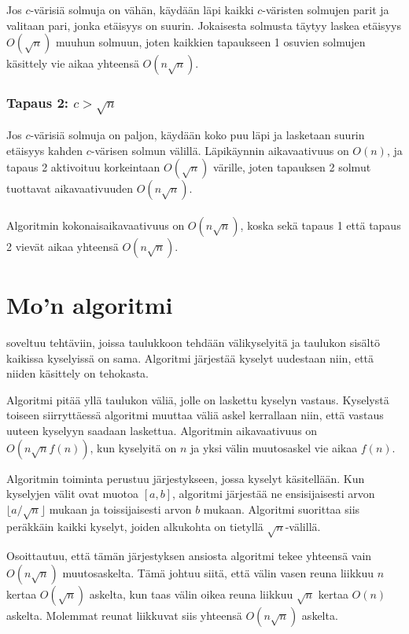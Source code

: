 Jos $c$-värisiä solmuja on vähän,
käydään läpi kaikki $c$-väristen solmujen parit
ja valitaan pari, jonka etäisyys on suurin.
Jokaisesta solmusta täytyy
laskea etäisyys $O(\sqrt n)$ muuhun solmuun,
joten kaikkien tapaukseen 1 osuvien solmujen
käsittely vie aikaa yhteensä $O(n \sqrt n)$.

\subsubsection*{Tapaus 2: $c > \sqrt n$}

Jos $c$-värisiä solmuja on paljon,
käydään koko puu läpi ja
lasketaan suurin etäisyys kahden
$c$-värisen solmun välillä.
Läpikäynnin aikavaativuus on $O(n)$,
ja tapaus 2 aktivoituu korkeintaan $O(\sqrt n)$
värille, joten tapauksen 2 solmut 
tuottavat aikavaativuuden $O(n \sqrt n)$.\\\\
\noindent
Algoritmin kokonaisaikavaativuus on $O(n \sqrt n)$,
koska sekä tapaus 1 että tapaus 2 vievät aikaa
yhteensä $O(n \sqrt n)$.

\section{Mo'n algoritmi}


 soveltuu tehtäviin,
joissa taulukkoon tehdään välikyselyitä ja
taulukon sisältö kaikissa kyselyissä on sama.
Algoritmi järjestää
kyselyt uudestaan niin,
että niiden käsittely on tehokasta.

Algoritmi pitää yllä taulukon väliä,
jolle on laskettu kyselyn vastaus.
Kyselystä toiseen siirryttäessä algoritmi
muuttaa väliä askel kerrallaan niin,
että vastaus uuteen kyselyyn saadaan laskettua.
Algoritmin aikavaativuus on $O(n \sqrt n f(n))$,
kun kyselyitä on $n$ ja 
yksi välin muutosaskel vie aikaa $f(n)$.

Algoritmin toiminta perustuu järjestykseen,
jossa kyselyt käsitellään.
Kun kyselyjen välit ovat muotoa $[a,b]$,
algoritmi järjestää ne ensisijaisesti arvon
$\lfloor a/\sqrt n \rfloor$ mukaan ja toissijaisesti arvon $b$ mukaan.
Algoritmi suorittaa siis peräkkäin kaikki kyselyt,
joiden alkukohta on tietyllä $\sqrt n$-välillä.

Osoittautuu, että tämän järjestyksen ansiosta
algoritmi tekee yhteensä vain $O(n \sqrt n)$ muutosaskelta.
Tämä johtuu siitä, että välin vasen reuna liikkuu
$n$ kertaa $O(\sqrt n)$ askelta,
kun taas välin oikea reuna liikkuu $\sqrt n$
kertaa $O(n)$ askelta. Molemmat reunat liikkuvat
siis yhteensä $O(n \sqrt n)$ askelta.

